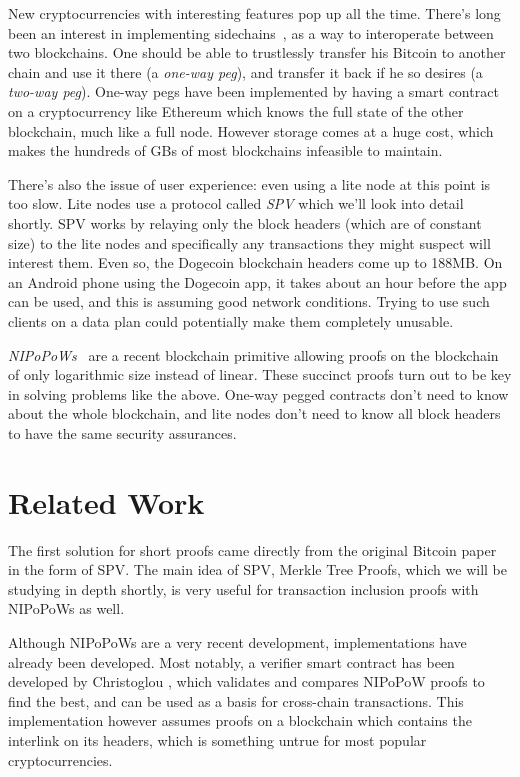 New cryptocurrencies with interesting features pop up all the time. There's long been an interest in implementing sidechains~\cite{sidechains}, as a way to interoperate between two blockchains. One should be able to trustlessly transfer his Bitcoin to another chain and use it there (a \emph{one-way peg}), and transfer it back if he so desires (a \emph{two-way peg}). One-way pegs have been implemented by having a smart contract on a cryptocurrency like Ethereum which knows the full state of the other blockchain, much like a full node. However storage comes at a huge cost, which makes the hundreds of GBs of most blockchains infeasible to maintain.

There's also the issue of user experience: even using a lite node at this point is too slow. Lite nodes use a protocol called \emph{SPV} which we'll look into detail shortly. SPV works by relaying only the block headers (which are of constant size) to the lite nodes and specifically any transactions they might suspect will interest them. Even so, the Dogecoin blockchain headers come up to 188MB. On an Android phone using the Dogecoin app, it takes about an hour before the app can be used, and this is assuming good network conditions. Trying to use such clients on a data plan could potentially make them completely unusable.

\emph{NIPoPoWs}~\cite{nipopows} are a recent blockchain primitive allowing proofs on the blockchain of only logarithmic size instead of linear. These succinct proofs turn out to be key in solving problems like the above. One-way pegged contracts don't need to know about the whole blockchain, and lite nodes don't need to know all block headers to have the same security assurances.

\section{Related Work}
The first solution for short proofs came directly from the original Bitcoin paper \cite{bitcoin} in the form of SPV. The main idea of SPV, Merkle Tree Proofs, which we will be studying in depth shortly, is very useful for transaction inclusion proofs with NIPoPoWs as well.

Although NIPoPoWs are a very recent development, implementations have already been developed. Most notably, a verifier smart contract has been developed by Christoglou \cite{christoglou}, which validates and compares NIPoPoW proofs to find the best, and can be used as a basis for cross-chain transactions. This implementation however assumes proofs on a blockchain which contains the interlink on its headers, which is something untrue for most popular cryptocurrencies.

